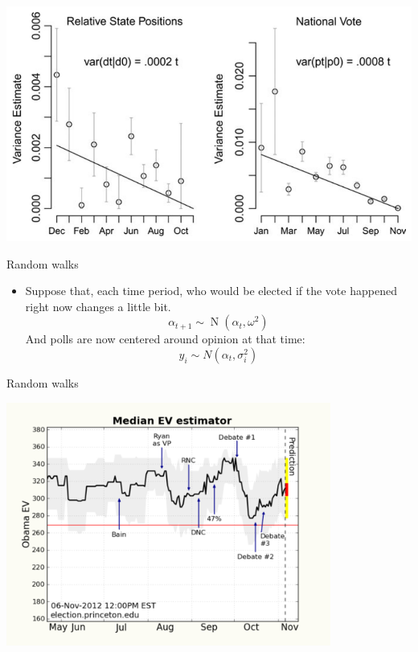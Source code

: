 \documentclass[14pt, t]{beamer}
\DeclareMathOperator{\N}{N}
\begin{document}
\begin{frame}
\begin{center}
\includegraphics[width=\textwidth]{bayescombo_timevariance.png}
\end{center}
\end{frame}

\begin{frame}{Random walks}
\begin{itemize}
	\item Suppose that, each time period, who would be elected if the vote happened right now changes a little bit. \[\alpha_{t+1} \sim \N(\alpha_t, \omega^2)\]
	And polls are now centered around opinion at that time: \[
		y_i \sim N(\alpha_t, \sigma_i^2)
	\]
\end{itemize}
\end{frame}

\begin{frame}{Random walks}	
\begin{center}
	\includegraphics[width=0.8\textwidth]{EV_history.png}
\end{center}
\end{frame}
\end{document}
